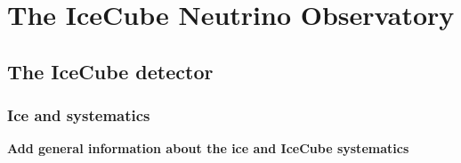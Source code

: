 \chapter{The IceCube Neutrino Observatory}\label{chapter:icecube}
\section{The IceCube detector}

\begingroup
\graphicspath{{results/HESE_Final_Paper/}}

\endgroup

\subsection{Ice and systematics}
\textbf{Add general information about the ice and IceCube systematics}
